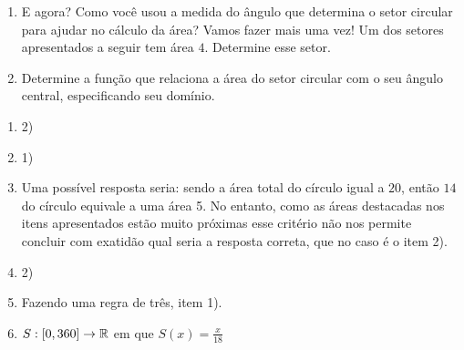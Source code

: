\documentclass[10 pt,usenames,dvipsnames, oneside]{article}
\begin{document}
\begin{enumerate}
\item{}
E agora? Como você usou a medida do ângulo que determina o setor circular para ajudar no cálculo da área? Vamos fazer mais uma vez! Um dos setores apresentados a seguir tem área \(4\). Determine esse setor.

\begin{figure}[H]
\centering


 \quad\quad\quad
      \quad\quad\quad
\end{figure}

\item{}
Determine a função que relaciona a área do setor circular com o seu ângulo central, especificando seu domínio.

\end{enumerate}

\ifdefined\prof
\clearpage
\begin{solucao}
\begin{enumerate}
\item 2)
\item 1)
\item Uma possível resposta seria: sendo a área total do círculo igual a $20$, então $14$ do círculo equivale a uma área 5. No entanto, como as áreas destacadas nos itens apresentados estão muito próximas esse critério não nos permite concluir com exatidão qual seria a resposta correta, que no caso é o item 2).
\item 2)
\item Fazendo uma regra de três, item 1).
\item $S:[0,360]\rightarrow\mathbb{R}$ em que $S(x)=\frac{x}{18}$
\end{enumerate}
\end{solucao}
\fi
\end{document}
